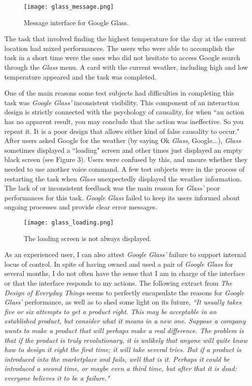 \documentclass[11pt,a4paper]{scrartcl}
\begin{document}
\begin{figure}[h]
\centering
\texttt{[image: glass\_message.png]}
\caption{Message interface for Google Glass.}
\end{figure}

The task that involved finding the highest temperature for the day at the current location had mixed performances. The users who were able to accomplish the task in a short time were the ones who did not hesitate to access Google search through the \textit{Glass} menu. A card with the current weather, including high and low temperature appeared and the task was completed. 

One of the main reasons some test subjects had difficulties in completing this task was \textit{Google Glass'} inconsistent visibility. This component of an interaction design is strictly connected with the psychology of causality, for when ``an action has no apparent result, you may conclude that the action was ineffective. So you repeat it. It is a poor design that allows either kind of false causality to occur."\cite{norman02} After users asked Google for the weather (by saying Ok \textit{Glass}, Google...), \textit{Glass} sometimes displayed a ``loading" screen and other times just displayed an empty black screen (see Figure 3). Users were confused by this, and unsure whether they needed to use another voice command. A few test subjects were in the process of restarting the task when \textit{Glass} unexpectedly displayed the weather information. The lack of or inconsistent feedback was the main reason for \textit{Glass'} poor performances for this task. \textit{Google Glass} failed to keep its users informed about ongoing processes and  provide clear error messages. 

\begin{figure}[h]
\centering
\texttt{[image: glass\_loading.png]}
\caption{The loading screen is not always displayed.}
\end{figure}

As an experienced user, I can also attest \textit{Google Glass'} failure to support internal locus of control. In spite of having owned and used a pair of \textit{Google Glass} for several months, I do not often have the sense that I am in charge of the interface or that the interface responds to my actions.  
The following extract from \textit{The Design of Everyday Things} seems to perfectly encapsulate the reasons for \textit{Google Glass'} performance, as well as to shed some light on its future, \textit{``It usually takes five or six attempts to get a product right. This may be acceptable in an established product, but consider what it means in a new one. Suppose a company wants to make a product that will perhaps make a real difference. The problem is that if the product is truly revolutionary, it is unlikely that anyone will quite know how to design it right the first time; it will take several tries. But if a product is introduced into the marketplace and fails, well that is it. Perhaps it could be introduced a second time, or maybe even a third time, but after that it is dead: everyone believes it to be a failure."}
\cite{norman02}
\end{document}
